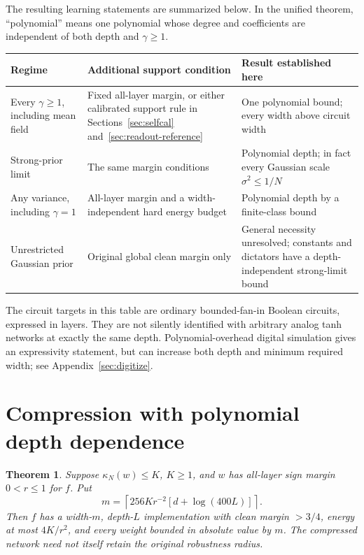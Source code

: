 \documentclass[11pt]{article}
\newtheorem{theorem}{Theorem}[section]
\begin{document}
The resulting learning statements are summarized below. In the unified theorem,
``polynomial'' means one polynomial whose degree and coefficients are independent
of both depth and $\gamma\ge1$.

\begin{center}
\begin{tabular}{>{\raggedright\arraybackslash}p{.24\linewidth}>{\raggedright\arraybackslash}p{.37\linewidth}>{\raggedright\arraybackslash}p{.28\linewidth}}
\toprule
Regime & Additional support condition & Result established here\\
\midrule
Every $\gamma\ge1$, including mean field & Fixed all-layer margin, or either calibrated support rule in Sections~\ref{sec:selfcal} and~\ref{sec:readout-reference} & One polynomial bound; every width above circuit width\\[3pt]
Strong-prior limit & The same margin conditions & Polynomial depth; in fact every Gaussian scale $\sigma^2\le1/N$\\[3pt]
Any variance, including $\gamma=1$ & All-layer margin and a width-independent hard energy budget & Polynomial depth by a finite-class bound\\[3pt]
Unrestricted Gaussian prior & Original global clean margin only & General necessity unresolved; constants and dictators have a depth-independent strong-limit bound\\
\bottomrule
\end{tabular}
\end{center}

The circuit targets in this table are ordinary bounded-fan-in Boolean
circuits, expressed in layers. They are not silently identified with
arbitrary analog tanh networks at exactly the same depth. Polynomial-overhead
digital simulation gives an expressivity statement, but can increase both
depth and minimum required width; see Appendix~\ref{sec:digitize}.

\section{Compression with polynomial depth dependence}

\begin{theorem}\label{thm:compression}
Suppose $\kappa_N(w)\le K$, $K\ge1$, and $w$ has all-layer sign margin
$0<r\le1$ for $f$. Put
\[
 m=\left\lceil256Kr^{-2}[d+\log(400L)]\right\rceil.
\]
Then $f$ has a width-$m$, depth-$L$ implementation with clean margin $>3/4$,
energy at most $4K/r^2$, and every weight bounded in absolute value by $m$.
The compressed network need not itself retain the original robustness radius.
\end{theorem}
\end{document}
